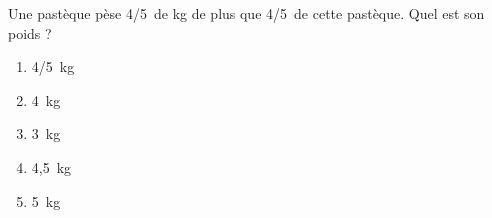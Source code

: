 Une pastèque pèse 4/5\ieme\ de kg de plus que 4/5\ieme\ de cette
pastèque. Quel est son poids ?
\begin{multicols}{5}
  \begin{enumerate}[A/]
  \item 4/5~kg
  \item 4~kg
  \item 3~kg
  \item 4,5~kg
  \item 5~kg
  \end{enumerate}
\end{multicols}